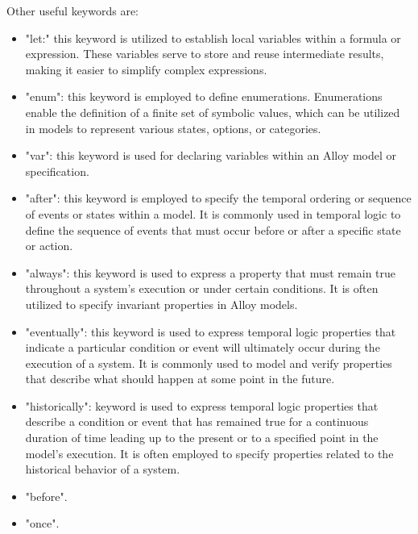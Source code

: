 \documentclass[12pt, a4paper]{report}
\begin{document}
        Other useful keywords are: 
        \begin{itemize}
            \item "let:" this keyword is utilized to establish local variables within a formula or expression. 
                These variables serve to store and reuse intermediate results, making it easier to simplify complex expressions.
            \item "enum": this keyword is employed to define enumerations. 
                Enumerations enable the definition of a finite set of symbolic values, which can be utilized in models to represent various states, options, or categories.
            \item "var": this keyword is used for declaring variables within an Alloy model or specification.
            \item "after": this keyword is employed to specify the temporal ordering or sequence of events or states within a model. 
                It is commonly used in temporal logic to define the sequence of events that must occur before or after a specific state or action.
            \item "always": this keyword is used to express a property that must remain true throughout a system's execution or under certain conditions.
                It is often utilized to specify invariant properties in Alloy models.
            \item "eventually": this keyword is used to express temporal logic properties that indicate a particular condition or event will ultimately occur during the execution of a system. 
                It is commonly used to model and verify properties that describe what should happen at some point in the future.
            \item "historically": keyword is used to express temporal logic properties that describe a condition or event that has remained true for a continuous duration of time leading up to the present or to a specified point in the model's execution.
                It is often employed to specify properties related to the historical behavior of a system.
            \item "before". 
            \item "once".
        \end{itemize}
\end{document}

